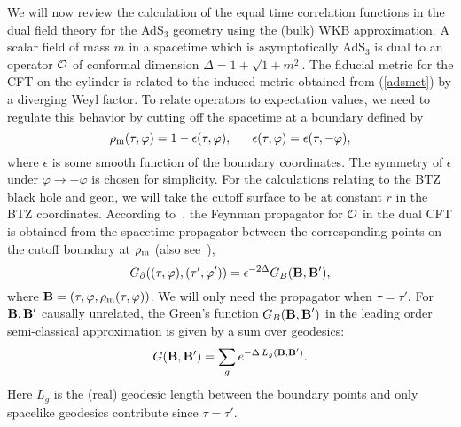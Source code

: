 \documentclass[a4paper,12pt]{article}
\def\calo{{\cal O}}
\begin{document}
We will now review the calculation of the equal time correlation
functions in the dual field theory for the AdS$_3$ geometry using the
(bulk) WKB approximation. A scalar field of mass $m$ in a spacetime
which is asymptotically AdS$_3$ is dual to an operator $\calo$ of
conformal dimension $\Delta = 1 + \sqrt{1 + m^2}$. The fiducial metric
for the CFT on the cylinder is related to the induced metric obtained
from (\ref{adsmet}) by a diverging Weyl factor.  To relate operators
to expectation values, we need to regulate this behavior by cutting
off the spacetime at a boundary defined by
% 
\begin{equation} 
\rho_{{\rm m}}(\tau,\varphi) = 1 - \epsilon(\tau,\varphi),~~~~~
\epsilon(\tau,\varphi) = \epsilon(\tau,-\varphi),
\label{regulate} 
\end{equation} 
% 
where $\epsilon$ is some smooth function of the boundary coordinates.
The symmetry of $\epsilon$ under $\varphi \rightarrow -\varphi$ is
chosen for simplicity. For the calculations relating to the BTZ black
hole and geon, we will take the cutoff surface to be at constant $r$
in the BTZ coordinates. According to~\cite{bdhm}, the Feynman
propagator for $\calo$ in the dual CFT is obtained from the spacetime
propagator between the corresponding points on the cutoff boundary at
$\rho_{\rm m}$ (also see~\cite{witten,gkp}),
%
\begin{equation} \label{prop}
G_\partial((\tau,\varphi),(\tau',\varphi')) = \epsilon^{-2 \Delta}
G_B({\bf B},{\bf B'}),
\end{equation}
%  
where ${\bf B} = (\tau,\varphi,\rho_{\rm m}(\tau,\varphi))$. We will
only need the propagator when $\tau=\tau'$.  For ${\bf B,B}'$ causally
unrelated, the Green's function $G_B({\bf B,B}')$ in the leading order
semi-classical approximation is given by a sum over geodesics:
% 
\begin{equation} 
G({\bf B},{\bf B}') = \sum_g e^{-\Delta \, L_g({\bf B},{\bf B}')}.
\label{sum1} 
\end{equation} 
% 
Here $L_g$ is the (real) geodesic length between the boundary 
points and only spacelike geodesics contribute since 
$\tau = \tau'$.
 
\end{document}

